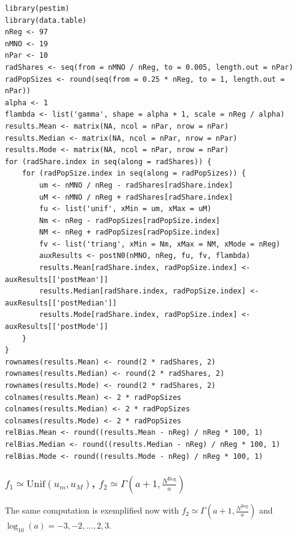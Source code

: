 \documentclass[12pt, a4paper]{article}
\begin{document}
\begin{verbatim}
library(pestim)
library(data.table)
nReg <- 97
nMNO <- 19
nPar <- 10
radShares <- seq(from = nMNO / nReg, to = 0.005, length.out = nPar)
radPopSizes <- round(seq(from = 0.25 * nReg, to = 1, length.out = nPar))
alpha <- 1
flambda <- list('gamma', shape = alpha + 1, scale = nReg / alpha)
results.Mean <- matrix(NA, ncol = nPar, nrow = nPar)
results.Median <- matrix(NA, ncol = nPar, nrow = nPar)
results.Mode <- matrix(NA, ncol = nPar, nrow = nPar)
for (radShare.index in seq(along = radShares)) {
    for (radPopSize.index in seq(along = radPopSizes)) {
        um <- nMNO / nReg - radShares[radShare.index]
        uM <- nMNO / nReg + radShares[radShare.index]
        fu <- list('unif', xMin = um, xMax = uM)
        Nm <- nReg - radPopSizes[radPopSize.index]
        NM <- nReg + radPopSizes[radPopSize.index]
        fv <- list('triang', xMin = Nm, xMax = NM, xMode = nReg)
        auxResults <- postN0(nMNO, nReg, fu, fv, flambda)
        results.Mean[radShare.index, radPopSize.index] <- auxResults[['postMean']] 
        results.Median[radShare.index, radPopSize.index] <- auxResults[['postMedian']]
        results.Mode[radShare.index, radPopSize.index] <- auxResults[['postMode']]
    }
}
rownames(results.Mean) <- round(2 * radShares, 2)
rownames(results.Median) <- round(2 * radShares, 2)
rownames(results.Mode) <- round(2 * radShares, 2)
colnames(results.Mean) <- 2 * radPopSizes
colnames(results.Median) <- 2 * radPopSizes
colnames(results.Mode) <- 2 * radPopSizes
relBias.Mean <- round((results.Mean - nReg) / nReg * 100, 1)
relBias.Median <- round((results.Median - nReg) / nReg * 100, 1)
relBias.Mode <- round((results.Mode - nReg) / nReg * 100, 1)
\end{verbatim}

\subsubsection{$f_{1}\simeq\textrm{Unif}(u_{m}, u_{M})$, $f_{2}\simeq\Gamma(a + 1, \frac{N^{\textrm{Reg}}}{a})$}

The same computation is exemplified now with $f_{2}\simeq\Gamma(a+1, \frac{N^{\textrm{Reg}}}{a})$ and $\log_{10}(a)=-3, -2, \dots, 2, 3$.
\end{document}

